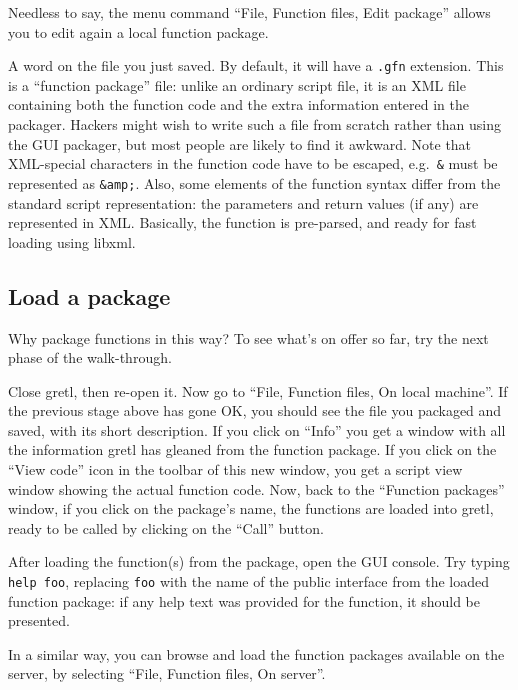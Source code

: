 Needless to say, the menu command ``File, Function files, Edit package''
allows you to edit again a local function package.

\vspace{6pt}

A word on the file you just saved.  By default, it will have a
\texttt{.gfn} extension.  This is a ``function package'' file: unlike
an ordinary  script file, it is an XML file containing both
the function code and the extra information entered in the packager.
Hackers might wish to write such a file from scratch rather than using
the GUI packager, but most people are likely to find it awkward.  Note
that XML-special characters in the function code have to be escaped,
e.g.\ \texttt{\&} must be represented as \texttt{\&amp;}.  Also, some
elements of the function syntax differ from the standard script
representation: the parameters and return values (if any) are
represented in XML.  Basically, the function is pre-parsed, and ready
for fast loading using \textsf{libxml}.

\vspace{6pt}

\subsection{Load a package}

Why package functions in this way?  To see what's on offer so far, try
the next phase of the walk-through.

Close gretl, then re-open it.  Now go to ``File, Function files, On
local machine''. If the previous stage above has gone OK, you should
see the file you packaged and saved, with its short description.  If
you click on ``Info'' you get a window with all the information gretl
has gleaned from the function package.  If you click on the ``View
code'' icon in the toolbar of this new window, you get a script view
window showing the actual function code. Now, back to the ``Function
packages'' window, if you click on the package's name, the functions
are loaded into gretl, ready to be called by clicking on the ``Call''
button.

After loading the function(s) from the package, open the GUI console.
Try typing \texttt{help foo}, replacing \texttt{foo} with the name of
the public interface from the loaded function package: if any help text
was provided for the function, it should be presented.

In a similar way, you can browse and load the function packages
available on the  server, by selecting ``File, Function
files, On server''.

